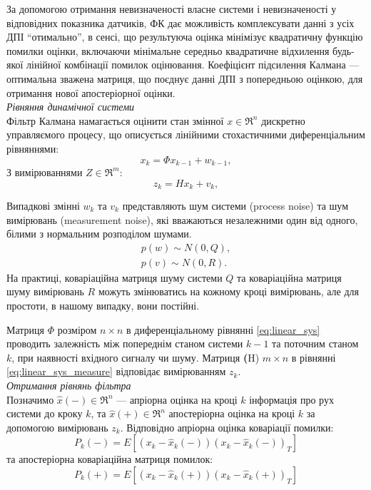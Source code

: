 За допомогою отримання невизначеності власне системи і невизначеності у відповідних 
показника датчиків, ФК дає можливість комплексувати данні з усіх ДПІ “отимально”, в 
сенсі, що результуюча оцінка мінімізує квадратичну функцію помилки оцінки, включаючи 
мінімальне середньо квадратичне відхилення будь-якої лінійної комбінації помилок оцінювання. 
Коефіцієнт підсилення Калмана — оптимальна зважена матриця, що поєднує данні ДПІ з попередньою 
оцінкою, для отримання нової апостеріорної оцінки.\\


\textit{Рівняння динамічної системи}\\

Фільтр Калмана намагається оцінити стан змінної $x\in \Re^{n}$ дискретно управляємого
процесу, що описується лінійними стохастичними диференціальним рівняннями:
\begin{equation}
\label{eq:linear_sys}
x_{k} = \Phi x_{k-1} + w_{k-1},
\end{equation}
З вимірюваннями  $Z\in \Re^{m}$:
\begin{equation}
\label{eq:linear_sys_measure}
z_{k} = Hx_{k} +v_{k},
\end{equation}

Випадкові змінні $w_{k}$ та $v_{k}$ представляють шум системи (process noise) та 
шум вимірювань (measurement noise), які вважаються незалежними один від одного,
білими з нормальним розподілом шумами.
\begin{eqnarray} 
\label{eq:pw} p(w)\sim N(0,Q), \\
\label{eq:pv} p(v)\sim N(0,R).
\end{eqnarray} 
На практиці, коваріаційна матриця шуму системи $Q$ та коваріаційна
матриця шуму вимірювань $R$ можуть змінюватись на кожному кроці вимірювань,
але для простоти, в нашому випадку, вони постійні.

Матриця $\Phi$ розміром $n \times n$ в диференціальному рівнянні \eqref{eq:linear_sys}
проводить залежність між попереднім станом системи $k-1$ та поточним станом
$k$, при наявності вхідного сигналу чи шуму. Матриця \textbf(H) $m \times n$ в 
рівнянні \eqref{eq:linear_sys_measure} відповідає вимірюванням $z_{k}$. \\

\textit{Отримання рівнянь фільтра}\\

Позначимо $\hat{x}(-) \in \Re^{n}$ --- апріорна оцінка на кроці $k$ 
інформація про рух системи до кроку $k$, та $\hat{x}(+) \in \Re^{n}$
апостеріорна оцінка на кроці $k$ за допомогою вимірювань $z_{k}$. 
Відповідно апріорна оцінка коваріації помилки:
\begin{equation}
\label{eq:p_minux}
P_{k}(-)= E[(x_{k}-\hat{x}_{k}(-))(x_{k}-\hat{x}_{k}(-))_{T}]
\end{equation}
та апостеріорна коваріаційна матриця помилок:
\begin{equation}
\label{eq:p_plus}
P_{k}(+)= E[(x_{k}-\hat{x}_{k}(+))(x_{k}-\hat{x}_{k}(+))_{T}]
\end{equation}

